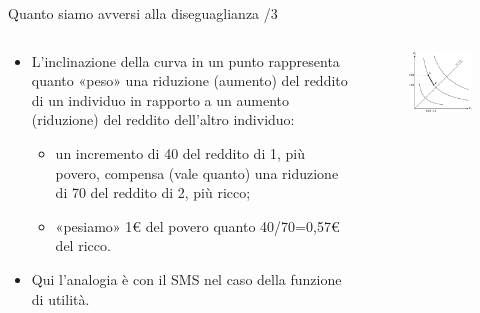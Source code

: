 \documentclass[aspectratio=64,11pt]{beamer}
\begin{document}
\begin{frame}{Quanto siamo avversi alla diseguaglianza /3}
\begin{columns}
\begin{column}{.5\columnwidth}
\begin{itemize}
\item L'inclinazione della curva in un punto rappresenta quanto «peso» una
riduzione (aumento) del reddito di un individuo in rapporto a un aumento
(riduzione) del reddito dell'altro individuo:
\begin{itemize}
\item un incremento di 40 del reddito di 1, più povero, compensa (vale quanto)
una riduzione di 70 del reddito di 2, più ricco;
\item «pesiamo» 1€ del povero quanto 40/70=0,57€ del ricco.
\end{itemize}
\item Qui l'analogia è con il SMS nel caso della funzione di utilità.
\end{itemize}
\end{column}

\begin{column}{.5\columnwidth}
\begin{figure}[htbp]
\centering
\includegraphics[width=\textwidth]{./figure/fbs-2.pdf}
\end{figure}
\end{column}
\end{columns}
\end{frame}
\end{document}

